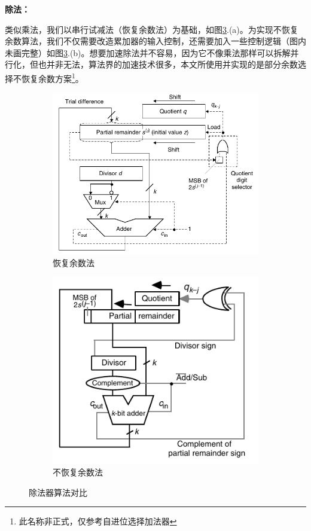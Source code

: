 \documentclass[UTF8,12pt,punct=kaiming,fontset=none]{ctexart}
\begin{document}
\textbf{除法：}

类似乘法，我们以串行试减法（恢复余数法）为基础，如图\ref{fig4}.(a)。为实现不恢复余数算法，我们不仅需要改造累加器的输入控制，还需要加入一些控制逻辑（图内未画完整）如图\ref{fig4}.(b)。想要加速除法并不容易，因为它不像乘法那样可以拆解并行化，但也并非无法，算法界的加速技术很多，本文所使用并实现的是部分余数选择不恢复余数方案\footnote{此名称非正式，仅参考自进位选择加法器}。
\begin{figure}[H]
    \centering
    \begin{subfigure}{3in}
        \centering
        \includegraphics[width=\linewidth]{div1.pdf}
        \caption{恢复余数法}
        \label{fig:a}
    \end{subfigure}
    \begin{subfigure}{2.5in}
        \centering
        \includegraphics[width=\linewidth]{div2.pdf}
        \caption{不恢复余数法}
        \label{ubfig:b}
    \end{subfigure}
    \caption{除法器算法对比\cite{parhami2010computer}}
    \label{fig4}
\end{figure}
\end{document}
